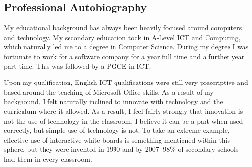 \subsection{Professional Autobiography}
My educational background has always been heavily focused around computers and technology. My secondary education took in A-Level ICT and Computing, which naturally led me to a degree in Computer Science. During my degree I was fortunate to work for a software company for a year full time and a further year part time. This was followed by a PGCE in ICT.

Upon my qualification, English ICT qualifications were still very prescriptive and based around the teaching of Microsoft Office skills. As a result of my background, I felt naturally inclined to innovate with technology and the curriculum where it allowed. As a result, I feel fairly strongly that innovation is not the use of technology in the classroom. I believe it can be a part when used correctly, but simple use of technology is not. To take an extreme example, effective use of interactive white boards is something mentioned within this sphere, but they were invented in 1990 and by 2007, 98\% \cite{kitchen2008harnessing} of secondary schools had them in every classroom.

